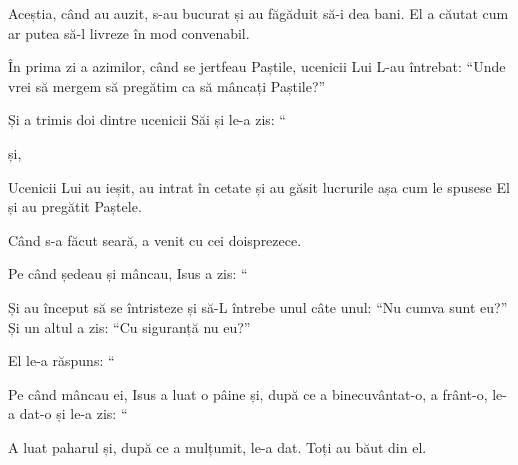 {Aceștia, când au auzit, s-au bucurat și au făgăduit să-i dea bani. El a căutat cum ar putea să-l livreze în mod convenabil.


\par }{\PP {}În prima zi a azimilor, când se jertfeau Paștile, ucenicii Lui L-au întrebat: “Unde vrei să mergem să pregătim ca să mâncați Paștile?”


\par }{\PP {}Și a trimis doi dintre ucenicii Săi și le-a zis: “{}

și,
{}



\par }{\PP {}Ucenicii Lui au ieșit, au intrat în cetate și au găsit lucrurile așa cum le spusese El și au pregătit Paștele.


\par }{\PP {}Când s-a făcut seară, a venit cu cei doisprezece.

Pe când ședeau și mâncau, Isus a zis: “{}


\par }{\PP {}Și au început să se întristeze și să-L întrebe unul câte unul: “Nu cumva sunt eu?” Și un altul a zis: “Cu siguranță nu eu?”


\par }{\PP {}El le-a răspuns: “{}



\par }{\PP {}Pe când mâncau ei, Isus a luat o pâine și, după ce a binecuvântat-o, a frânt-o, le-a dat-o și le-a zis: “{}


\par }{\PP {}A luat paharul și, după ce a mulțumit, le-a dat. Toți au băut din el.

}
